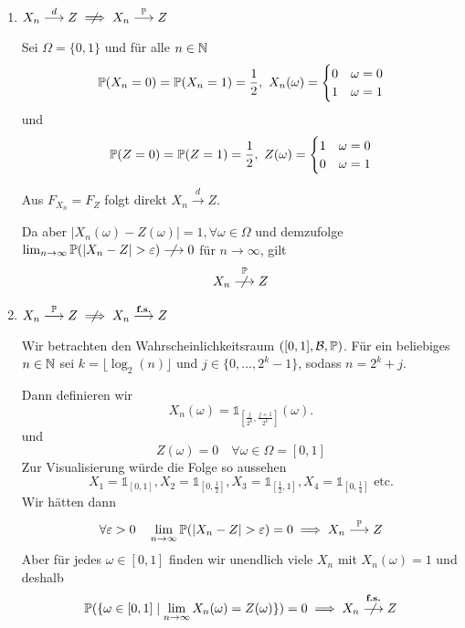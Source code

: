 \begin{enumerate}
    \item $X_n \overset{d}{\longrightarrow} Z \centernot\implies X_n \overset{\P}{\longrightarrow} Z$
    
    Sei $\Omega = \{0, 1\}$ und für alle $n \in \N$
    $$\P(X_n = 0) = \P(X_n = 1) = \frac{1}{2}, \ X_n(\omega) = \begin{cases}
        0 & \omega = 0\\
        1 & \omega = 1
    \end{cases} 
    $$
    und $$\P(Z = 0) = \P(Z = 1) = \frac{1}{2}, \ Z(\omega) = \begin{cases}
        1 & \omega = 0\\
        0 & \omega = 1
    \end{cases} $$

    Aus $F_{X_n} = F_Z$ folgt direkt $X_n \overset{d}{\longrightarrow} Z$.
    
    Da aber $|X_n(\omega) - Z(\omega)| = 1, \forall \omega \in \Omega$ und demzufolge\\ 
    $\limn \P(|X_n - Z| > \varepsilon) \centernot\longrightarrow 0$ für $n \to \infty$, gilt  
    $$X_n \overset{\P}{\centernot\longrightarrow} Z$$
    \item $X_n \overset{\P}{\longrightarrow} Z \centernot\implies X_n \overset{\textbf{f.s.}}{\longrightarrow} Z$
    
    Wir betrachten den Wahrscheinlichkeitsraum $([0,1], \mathcal{B}, \P)$.
    Für ein beliebiges $n \in \N$ sei $k = \lfloor\log_2(n)\rfloor$ und $j \in \{0, \ldots, 2^k-1\}$, sodass $n = 2^k + j$.
    
    Dann definieren wir 
    $$X_n(\omega) = \mathds{1}_{\left[\frac{j}{2^k}, \frac{j+1}{2^k}\right]}(\omega).$$
    und
    $$Z(\omega) = 0 \quad \forall \omega \in \Omega = [0,1]$$
    Zur Visualisierung würde die Folge so aussehen
    $$X_1 = \mathds{1}_{[0,1]}, X_2 = \mathds{1}_{\left[0,\frac{1}{2}\right]}, X_3 = \mathds{1}_{\left[\frac{1}{2}, 1\right]}, X_4 = \mathds{1}_{\left[0,\frac{1}{4}\right]} \text{ etc.}$$
    Wir hätten dann
    $$\forall \varepsilon > 0 \quad \limn \P(|X_n - Z| > \varepsilon) = 0 \implies X_n \overset{\P}{\longrightarrow} Z$$
    Aber für jedes $\omega \in [0,1]$ finden wir unendlich viele $X_n$ mit $X_n(\omega) = 1$ und deshalb
    $$\P(\{\omega \in [0,1] \mid \limn X_n(\omega) = Z(\omega)\}) = 0 \implies X_n \overset{\textbf{f.s.}}{\centernot\longrightarrow} Z$$
\end{enumerate}
